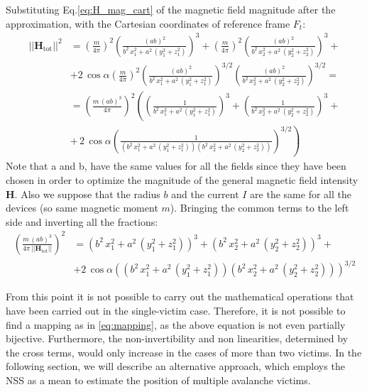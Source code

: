 \noindent
Substituting Eq.\ref{eq:H_mag_cart} of the magnetic field magnitude after the approximation, 
with the Cartesian coordinates of reference frame $F_t$:
\[
\begin{aligned}
|| \mathbf{H}_{\text{tot}}||^2 &= \left( \frac{m}{4 \pi} \right)^2 \left( \frac{(ab)^2}{b^2 \, x_1^2 + a^2 \, (y_1^2 + z_1^2)} \right)^3 
+ \left( \frac{m}{4 \pi} \right)^2 \left( \frac{(ab)^2}{b^2 \, x_2^2 + a^2 \, (y_2^2 + z_2^2)} \right)^3 + \\
& + 2 \, \cos \alpha \left( \frac{m}{4 \pi} \right)^2 \left( \frac{(ab)^2}{b^2 \, x_1^2 + a^2 \, (y_1^2 + z_1^2)} \right)^{3/2} \left( \frac{(ab)^2}{b^2 \, x_2^2 + a^2 \, (y_2^2 + z_2^2)} \right)^{3/2} = \\
&= \left( \frac{m \, (ab)^3}{4 \pi} \right)^2 \left( \left( \frac{1}{b^2 \, x_1^2 + a^2 \, (y_1^2 + z_1^2)} \right)^3 
+  \left( \frac{1}{b^2 \, x_2^2 + a^2 \, (y_2^2 + z_2^2)} \right)^3 \right. + \\
& \left. + \, 2 \, \cos \alpha \left( \frac{1}{(b^2 \, x_1^2 + a^2 \, (y_1^2 + z_1^2))(b^2 \, x_2^2 + a^2 \, (y_2^2 + z_2^2))} \right)^{3/2} \right)
\end{aligned}
\]
Note that a and b, have the same values for all the fields since they have been chosen in order to optimize the magnitude of the 
general magnetic field intensity $\mathbf{H}$. 
Also we suppose that the radius $b$ and the current $I$ are the same for all the devices (so same magnetic moment $m$).
Bringing the common terms to the left side and inverting all the fractions:
\[
\begin{aligned}
\left( \frac{m \, (a b)^3}{4 \pi \, || \mathbf{H}_{\text{tot}}||} \right)^2 &= \left( b^2 \, x_1^2 + a^2 \, (y_1^2 + z_1^2) \right)^3 + \left( b^2 \, x_2^2 + a^2 \, (y_2^2 + z_2^2) \right)^3 + \\
& + 2 \, \cos \alpha \left( (b^2 \, x_1^2 + a^2 \, (y_1^2 + z_1^2))(b^2 \, x_2^2 + a^2 \, (y_2^2 + z_2^2)) \right)^{3/2}
\end{aligned}
\]

\noindent
From this point it is not possible to carry out the mathematical operations that 
have been carried out in the single-victim case.
Therefore, it is not possible to find a mapping as in \ref{eq:mapping},
as the above equation is not even partially bijective.
Furthermore, the non-invertibility and non linearities, determined by the cross terms,
would only increase in the cases of more than two victims.
In the following section, we will describe an alternative approach, which employs the
NSS as a mean to estimate the position of multiple avalanche victims. 

